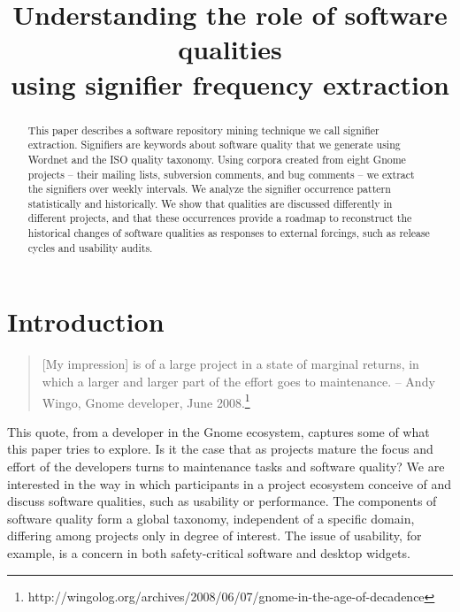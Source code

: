 \documentclass[conference, compsoc]{IEEEtran}
\begin{document}

 
\title{Understanding the role of software qualities\\ using signifier frequency extraction}

\author{
}

\maketitle

\begin{abstract}
This paper describes a software repository mining technique we call signifier extraction. Signifiers are keywords about software quality that we generate using Wordnet and the ISO quality taxonomy. Using corpora created from eight Gnome projects -- their mailing lists, subversion comments, and bug comments -- we extract the signifiers over weekly intervals. We analyze the signifier occurrence pattern statistically and historically. We show that qualities are discussed differently in different projects, and that these occurrences provide a roadmap to reconstruct the historical changes of software qualities as responses to external forcings, such as release cycles and usability audits. %
\end{abstract}
\vspace{-2mm}
\section{Introduction}\label{sect:introduction}%
\vspace{-2mm}
\begin{quote}[My impression] is of a large project in a state of marginal returns, in which a larger and larger part of the effort goes to maintenance. -- Andy Wingo, Gnome developer, June 2008.\footnote{http://wingolog.org/archives/2008/06/07/gnome-in-the-age-of-decadence}\end{quote}
	This quote, from a developer in the Gnome ecosystem, captures some of what this paper tries to explore. Is it the case that as projects mature the focus and effort of the developers turns to maintenance tasks and software quality? 
We are interested in the way in which participants in a project ecosystem conceive of and discuss software qualities, such as usability or performance. The components of software quality form a global taxonomy, independent of a specific domain, differing among projects only in degree of interest. The issue of usability, for example, is a concern in both safety-critical software and desktop widgets. 
\end{document}
